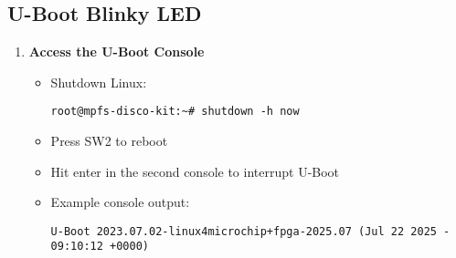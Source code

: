 \subsection{U-Boot Blinky LED}

\begin{enumerate}
\item \textbf{Access the U-Boot Console}
%
\begin{itemize}
\item Shutdown Linux:
\begin{verbatim}
root@mpfs-disco-kit:~# shutdown -h now
\end{verbatim}
\item Press SW2 to reboot
\item Hit enter in the second console to interrupt U-Boot
\item Example console output:
\begin{verbatim}
U-Boot 2023.07.02-linux4microchip+fpga-2025.07 (Jul 22 2025 - 09:10:12 +0000)


\end{verbatim}
\end{itemize}
\end{enumerate}
